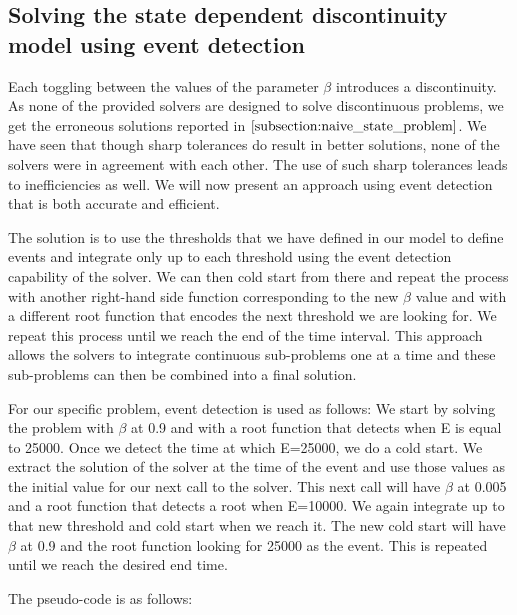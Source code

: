 \subsection{Solving the state dependent discontinuity model using event detection}
\label{subsection:state_with_event_detection}
Each toggling between the values of the parameter $\beta$ introduces a discontinuity. As none of the provided solvers are designed to solve discontinuous problems, we get the erroneous solutions reported in $\ref{subsection:naive_state_problem}$. We have seen that though sharp tolerances do result in better solutions, none of the solvers were in agreement with each other. The use of such sharp tolerances leads to inefficiencies as well. We will now present an approach using event detection that is both accurate and efficient.

The solution is to use the thresholds that we have defined in our model to define events and integrate only up to each threshold using the event detection capability of the solver. We can then cold start from there and repeat the process with another right-hand side function corresponding to the new $\beta$ value and with a different root function that encodes the next threshold we are looking for. We repeat this process until we reach the end of the time interval. This approach allows the solvers to integrate continuous sub-problems one at a time and these sub-problems can then be combined into a final solution.

For our specific problem, event detection is used as follows:
We start by solving the problem with $\beta$ at 0.9 and with a root function that detects when E is equal to 25000. Once we detect the time at which E=25000, we do a cold start. We extract the solution of the solver at the time of the event and use those values as the initial value for our next call to the solver. This next call will have $\beta$ at 0.005 and a root function that detects a root when E=10000. We again integrate up to that new threshold and cold start when we reach it. The new cold start will have $\beta$ at 0.9 and the root function looking for 25000 as the event. This is repeated until we reach the desired end time.

The pseudo-code is as follows:

